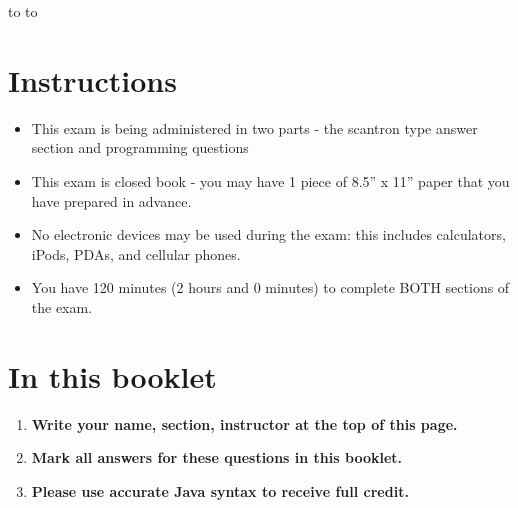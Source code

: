 \documentclass[11pt,answers]{exam}
\begin{document}
\begin{center} 
\end{center} 

\lstset{language=Java,numbers=left, numberstyle=\tiny, stepnumber=1, numbersep=5pt, showstringspaces=true}

\vspace{0.1in} 
\hbox to \textwidth{Name:\enspace\hrulefill} 
\hbox to \textwidth{Instructor/Section:\enspace\hrulefill} 

\section*{Instructions}
\begin{itemize}
 \item This exam is being administered in two parts - the scantron type answer section and programming questions
 \item This exam is closed book - you may have 1 piece of 8.5” x 11” paper that you have prepared in advance.
 \item No electronic devices may be used during the exam: this includes calculators, iPods, PDAs, and cellular phones. 
 \item You have 120 minutes (2 hours and 0 minutes) to complete BOTH sections of the exam. 
\end{itemize}

\section*{In this booklet}
\begin{enumerate}
	\item {\bf Write your name, section, instructor at the top of this page.}
	\item {\bf Mark all answers for these questions in this booklet.}
	\item {\bf Please use accurate Java syntax to receive full credit.}
\end{enumerate}	
\end{document}
